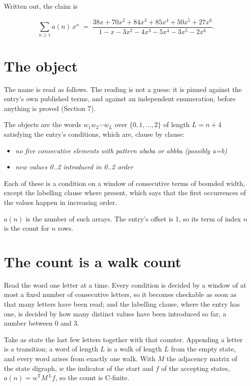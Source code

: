 \documentclass[11pt]{article}
\theoremstyle{definition}
\begin{document}
Written out, the claim is

\[\sum_{n \ge 1} a(n)\,x^n \;=\; \frac{38x + 70x^{2} + 84x^{3} + 85x^{4} + 50x^{5} + 27x^{6}}{1 - x - 3x^{2} - 4x^{3} - 5x^{4} - 3x^{5} - 2x^{6}}.\]

\section{The object}

The name is read as follows. The reading is not a guess: it is pinned against the entry's own published terms, and against an independent enumeration, before anything is proved (Section 7).

The objects are the words $w_1 w_2 \cdots w_L$ over $\{0,1,\dots,2\}$ of length $L = n + 4$ satisfying the entry's conditions, which are, clause by clause:

\begin{itemize}

\item {\itshape no five consecutive elements with pattern ababa or abbba (possibly a=b)}

\item {\itshape new values 0..2 introduced in 0..2 order}

\end{itemize}

Each of these is a condition on a window of consecutive terms of bounded width, except the labelling clause where present, which says that the first occurrences of the values happen in increasing order.

$a(n)$ is the number of such arrays. The entry's offset is 1, so its term of index $n$ is the count for $n$ rows.

\section{The count is a walk count}

Read the word one letter at a time. Every condition is decided by a window of at most a fixed number of consecutive letters, so it becomes checkable as soon as that many letters have been read; and the labelling clause, where the entry has one, is decided by how many distinct values have been introduced so far, a number between $0$ and 3.

Take as state the last few letters together with that counter. Appending a letter is a transition; a word of length $L$ is a walk of length $L$ from the empty state, and every word arises from exactly one walk. With $M$ the adjacency matrix of the state digraph, $w$ the indicator of the start and $f$ of the accepting states, $a(n) = w^{\mathsf T}M^{\,L}f$, so the count is C-finite.
\end{document}
